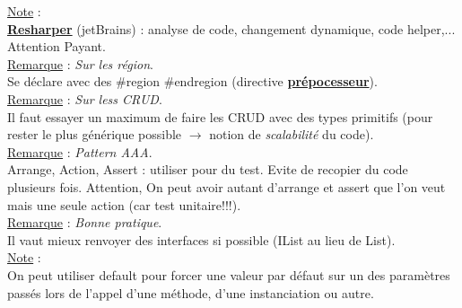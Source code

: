 \documentclass[a4paper,12pt,twoside]{article}
\newcommand{\urlcolor}{magenta}  %
\newcommand{\keycolor}{purple} %
\newcommand{\incode}[1]{{\footnotesize\ttfamily #1}} %
\newcommand{\rem}[2]{\noindent\underline{Remarque} : \textit{#1}.\\ \indent #2}
\newcommand{\note}[1]{\noindent\underline{Note} : \\ \indent #1}
\newcommand{\keyref}[2]{\hypersetup{urlcolor=\keycolor} \href{#1}{\textbf{#2}}\hypersetup{urlcolor=\urlcolor}}
\begin{document}
\note{\keyref{https://www.jetbrains.com/fr-fr/resharper/}{Resharper} (jetBrains) : analyse de code, changement dynamique, code helper,... Attention Payant.}\\

\rem{Sur les région}{Se déclare avec des \#region \#endregion (directive \keyref{https://docs.microsoft.com/fr-fr/dotnet/csharp/language-reference/preprocessor-directives}{prépocesseur}).}\\

\rem{Sur less CRUD}{Il faut essayer un maximum de faire les CRUD avec des types primitifs (pour rester le plus générique possible $\to$ notion de \textit{scalabilité} du code).}\\

\rem{Pattern AAA}{Arrange, Action, Assert : utiliser pour du test. Evite de recopier du code plusieurs fois. Attention, On peut avoir autant d'arrange et assert que l'on veut mais une seule action (car test unitaire!!!).}\\

\rem{Bonne pratique}{Il vaut mieux renvoyer des interfaces si possible (IList au lieu de List).}\\

\note{On peut utiliser \incode{default} pour forcer une valeur par défaut sur un des paramètres passés lors de l'appel d'une méthode, d'une instanciation ou autre.}\\

\newpage
\printglossary[type=\acronymtype]%
\glsaddallunused %
\printglossary[type = main,nonumberlist]%
\end{document}
